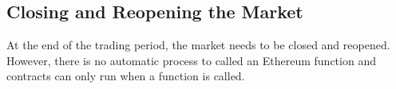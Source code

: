 


\subsection{Closing and Reopening the Market}


At the end of the trading period, the market needs to be closed and reopened. However, there is no automatic process to called an Ethereum function and contracts can only run when a function is called. 


